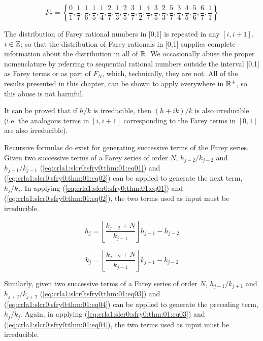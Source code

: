 \begin{equation}
\label{eq:crla1:slcr0:sfry0:eq0001g}
F_7  = \left\{ {\frac{0}{1},\frac{1}{7},\frac{1}{6},\frac{1}{5},
                \frac{1}{4},\frac{2}{7},
                \frac{1}{3},\frac{2}{5},\frac{3}{7},\frac{1}{2},
                \frac{4}{7},\frac{3}{5},\frac{2}{3},
                \frac{5}{7},\frac{3}{4},
                \frac{4}{5},
                \frac{5}{6},\frac{6}{7},\frac{1}{1} } \right\}
\end{equation}

The distribution of Farey rational numbers in
[0,1] is repeated
in any
$[i,i+1]$, $i\in {\mathbb{Z}}$; so that the distribution of
Farey rationals in [0,1] supplies complete
information about the distribution in
all of ${\mathbb{R}}$.  We
occasionally abuse the proper nomenclature by referring
to sequential rational numbers outside the
interval [0,1] as Farey terms or as part of
$F_N$, which, technically, they are not.
All of the results presented in
this chapter, can be shown to apply
everywhere in ${\mathbb{R}^+}$, so this abuse
is not harmful.

It can be proved that if $h/k$ is irreducible, then 
$(h+ik)/k$ is also irreducible (i.e. the analogous terms
in $[i, i+1]$ corresponding to the Farey terms in 
$[0,1]$ are also irreducible).

Recursive formulas do exist for generating 
successive terms of the Farey series.
Given two successive terms of a Farey series of
order $N$, $h_{j-2}/k_{j-2}$ and $h_{j-1}/k_{j-1}$
(\ref{eq:crla1:slcr0:sfry0:thm:01:eq01})
and
(\ref{eq:crla1:slcr0:sfry0:thm:01:eq02}) 
can be applied to generate the next term, 
$h_{j}/k_{j}$\@.  In applying
(\ref{eq:crla1:slcr0:sfry0:thm:01:eq01})
and
(\ref{eq:crla1:slcr0:sfry0:thm:01:eq02}), the
two terms used as input must be irreducible.

\begin{equation}
\label{eq:crla1:slcr0:sfry0:thm:01:eq01}
h_{j}  = \left\lfloor {\frac{{k_{j-2}
     + N}}{{k_{j - 1} }}} \right\rfloor h_{j - 1}  - h_{j-2}
\end{equation}

\begin{equation}
\label{eq:crla1:slcr0:sfry0:thm:01:eq02}
k_{j}  = \left\lfloor {\frac{{k_{j-2}  + N}}{{k_{j
     - 1} }}} \right\rfloor k_{j - 1}  - k_{j-2}
\end{equation}

Similarly, given two successive terms of a Farey series of
order $N$, $h_{j+1}/k_{j+1}$ and $h_{j+2}/k_{j+2}$
(\ref{eq:crla1:slcr0:sfry0:thm:01:eq03})
and
(\ref{eq:crla1:slcr0:sfry0:thm:01:eq04}) 
can be applied to generate the preceding term, 
$h_{j}/k_{j}$\@.  Again, in applying
(\ref{eq:crla1:slcr0:sfry0:thm:01:eq03})
and
(\ref{eq:crla1:slcr0:sfry0:thm:01:eq04}), the
two terms used as input must be irreducible.

